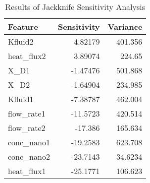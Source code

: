 
    \begin{table*}
        \centering
        \begin{tabular}{lrr}
\hline
 Feature     &   Sensitivity &   Variance \\
\hline
 Kfluid2     &       4.82179 &   401.356  \\
 heat\_flux2 &       3.89074 &   224.65   \\
 X\_D1       &      -1.47476 &   501.868  \\
 X\_D2       &      -1.64904 &   234.985  \\
 Kfluid1     &      -7.38787 &   462.004  \\
 flow\_rate1 &     -11.5723  &   420.514  \\
 flow\_rate2 &     -17.386   &   165.634  \\
 conc\_nano1 &     -19.2583  &   623.708  \\
 conc\_nano2 &     -23.7143  &    34.6234 \\
 heat\_flux1 &     -25.1771  &   106.623  \\
\hline
\end{tabular}
        \caption{Results of Jackknife Sensitivity Analysis}
        \label{jackknife}
    \end{table*}
    
